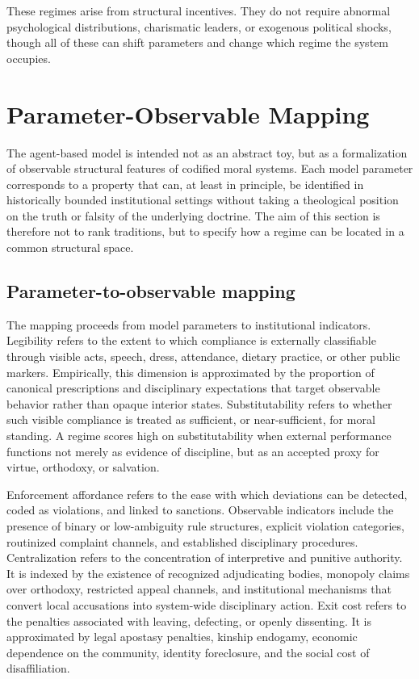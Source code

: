 \documentclass[12pt]{article}
\begin{document}
These regimes arise from structural incentives. They do not require abnormal psychological distributions, charismatic leaders, or exogenous political shocks, though all of these can shift parameters and change which regime the system occupies.



\section{Parameter-Observable Mapping}

The agent-based model is intended not as an abstract toy, but as a formalization of observable structural features of codified moral systems. Each model parameter corresponds to a property that can, at least in principle, be identified in historically bounded institutional settings without taking a theological position on the truth or falsity of the underlying doctrine. The aim of this section is therefore not to rank traditions, but to specify how a regime can be located in a common structural space.

\subsection{Parameter-to-observable mapping}

The mapping proceeds from model parameters to institutional indicators. Legibility refers to the extent to which compliance is externally classifiable through visible acts, speech, dress, attendance, dietary practice, or other public markers. Empirically, this dimension is approximated by the proportion of canonical prescriptions and disciplinary expectations that target observable behavior rather than opaque interior states. Substitutability refers to whether such visible compliance is treated as sufficient, or near-sufficient, for moral standing. A regime scores high on substitutability when external performance functions not merely as evidence of discipline, but as an accepted proxy for virtue, orthodoxy, or salvation.

Enforcement affordance refers to the ease with which deviations can be detected, coded as violations, and linked to sanctions. Observable indicators include the presence of binary or low-ambiguity rule structures, explicit violation categories, routinized complaint channels, and established disciplinary procedures. Centralization refers to the concentration of interpretive and punitive authority. It is indexed by the existence of recognized adjudicating bodies, monopoly claims over orthodoxy, restricted appeal channels, and institutional mechanisms that convert local accusations into system-wide disciplinary action. Exit cost refers to the penalties associated with leaving, defecting, or openly dissenting. It is approximated by legal apostasy penalties, kinship endogamy, economic dependence on the community, identity foreclosure, and the social cost of disaffiliation.
\end{document}
